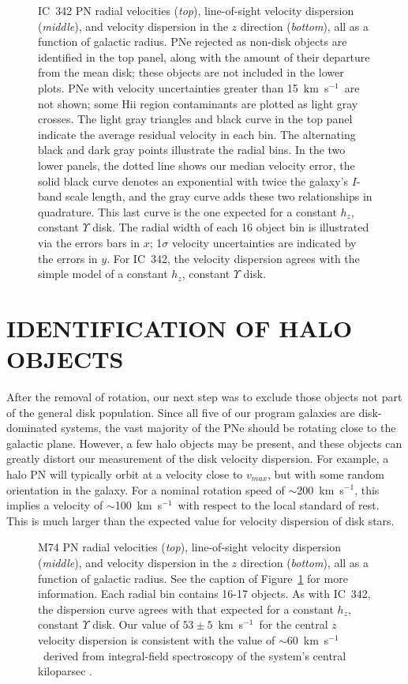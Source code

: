 \documentclass[12pt,preprint]{emulateapj}
\newcommand{\kms}{km~s$^{-1}$}
\begin{document}
\begin{figure}[t]
\caption{\scriptsize IC~342 PN radial velocities ({\it top}), line-of-sight velocity dispersion ({\it middle}), and velocity dispersion in the $z$ direction ({\it bottom}), all as a function of galactic radius.  PNe rejected as non-disk objects are identified in the top panel, along with the amount of their departure from the mean disk; these objects are not included in the lower plots.  PNe with velocity uncertainties greater than 15~\kms\ are not shown; some H{\sc ii} region contaminants are plotted as light gray crosses.  The light gray triangles and black curve in the top panel indicate the average residual velocity in each bin.  The alternating black and dark gray points illustrate the radial bins. In the two lower panels, the dotted line shows our median velocity error, the solid black curve denotes an exponential with twice the galaxy's $I$-band scale length, and the gray curve adds these two relationships in quadrature.  This last curve is the one expected for a constant $h_z$, constant $\Upsilon$ disk.  The radial width of each 16 object bin is illustrated via the errors bars in $x$; 1$\sigma$ velocity uncertainties are indicated by the errors in $y$.  For IC~342, the velocity dispersion agrees with the simple model of a constant $h_z$, constant $\Upsilon$ disk. \label{ICrsds3} }
\end{figure}

\section{IDENTIFICATION OF HALO OBJECTS}
After the removal of rotation, our next step was to exclude those objects not part of the general disk population.  Since all five of our program galaxies are disk-dominated systems, the vast majority of the PNe should be rotating close to the galactic plane.  However, a few halo objects may be present, and these objects can greatly distort our measurement of the disk velocity dispersion.   For example, a halo PN will typically orbit at a velocity close to $v_{max}$, but with some random orientation in the galaxy.  For a nominal rotation speed of $\sim$200~\kms, this implies a velocity of $\sim$100~\kms\ with respect to the local standard of rest.  This is much larger than the expected value for velocity dispersion of disk stars.

\begin{figure}[b]
\caption{\scriptsize M74 PN radial velocities ({\it top}), line-of-sight velocity dispersion ({\it middle}), and velocity dispersion in the $z$ direction ({\it bottom}), all as a function of galactic radius.  See the caption of Figure~\ref{ICrsds3} for more information.  Each radial bin contains 16-17 objects.  As with IC~342, the dispersion curve agrees with that expected for a constant $h_z$, constant $\Upsilon$ disk.  Our value of $53 \pm 5$~\kms\ for the central $z$ velocity dispersion is consistent with the value of $\sim$60~\kms\ derived from integral-field spectroscopy of the system's central kiloparsec \citep{g+06}. \label{M74rsds3}}
\end{figure}
\end{document}
